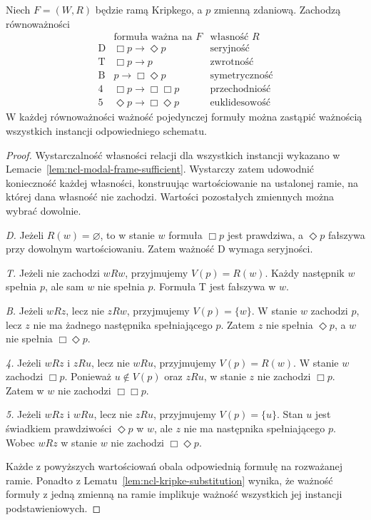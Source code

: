 \begin{twierdzenie}[Korespondencja D, T, B, 4 i 5]
\label{thm:ncl-kripke-basic-correspondence}
Niech $F=(W,R)$ będzie ramą Kripkego,
a $p$ zmienną zdaniową. Zachodzą równoważności
\[
\begin{array}{c|l|l}
 &\text{formuła ważna na }F&\text{własność }R\\ \hline
 \mathrm D&\Box p\to\Diamond p&\text{seryjność}\\
 \mathrm T&\Box p\to p&\text{zwrotność}\\
 \mathrm B&p\to\Box\Diamond p&\text{symetryczność}\\
 4&\Box p\to\Box\Box p&\text{przechodniość}\\
 5&\Diamond p\to\Box\Diamond p&\text{euklidesowość}
\end{array}
\]
W każdej równoważności ważność pojedynczej
formuły można zastąpić ważnością wszystkich
instancji odpowiedniego schematu.
\end{twierdzenie}
\begin{proof}
Wystarczalność własności relacji dla wszystkich
instancji wykazano w Lemacie~\ref{lem:ncl-modal-frame-sufficient}.
Wystarczy zatem udowodnić konieczność
każdej własności, konstruując wartościowanie
na ustalonej ramie, na której dana własność
nie zachodzi. Wartości pozostałych zmiennych
można wybrać dowolnie.

\emph{D.} Jeżeli $R(w)=\varnothing$,
to w stanie $w$ formuła $\Box p$ jest prawdziwa,
a $\Diamond p$ fałszywa przy dowolnym
wartościowaniu. Zatem ważność D wymaga seryjności.

\emph{T.} Jeżeli nie zachodzi $wRw$,
przyjmujemy $V(p)=R(w)$. Każdy następnik
$w$ spełnia $p$, ale sam $w$ nie spełnia $p$.
Formuła T jest fałszywa w $w$.

\emph{B.} Jeżeli $wRz$, lecz nie $zRw$,
przyjmujemy $V(p)=\{w\}$. W stanie $w$
zachodzi $p$, lecz $z$ nie ma żadnego
następnika spełniającego $p$.
Zatem $z$ nie spełnia $\Diamond p$,
a $w$ nie spełnia $\Box\Diamond p$.

\emph{4.} Jeżeli $wRz$ i $zRu$, lecz nie $wRu$,
przyjmujemy $V(p)=R(w)$. W stanie $w$
zachodzi $\Box p$. Ponieważ $u\notin V(p)$
oraz $zRu$, w stanie $z$ nie zachodzi $\Box p$.
Zatem w $w$ nie zachodzi $\Box\Box p$.

\emph{5.} Jeżeli $wRz$ i $wRu$, lecz nie $zRu$,
przyjmujemy $V(p)=\{u\}$. Stan $u$ jest świadkiem
prawdziwości $\Diamond p$ w $w$, ale $z$ nie ma
następnika spełniającego $p$. Wobec $wRz$
w stanie $w$ nie zachodzi $\Box\Diamond p$.

Każde z powyższych wartościowań obala
odpowiednią formułę na rozważanej ramie.
Ponadto z Lematu~\ref{lem:ncl-kripke-substitution}
wynika, że ważność formuły z jedną zmienną
na ramie implikuje ważność wszystkich jej
instancji podstawieniowych.
\end{proof}

